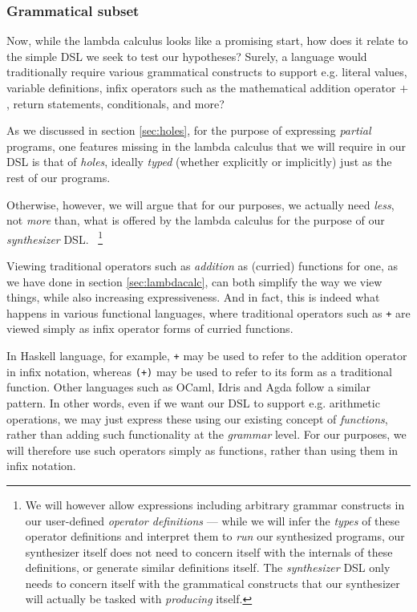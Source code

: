 \documentclass{article}
\begin{document}
\subsubsection{Grammatical subset}

Now, while the lambda calculus looks like a promising start,
how does it relate to the simple DSL we seek to test our hypotheses?
Surely, a language would traditionally require various grammatical constructs to support e.g.
literal values, variable definitions, infix operators such as the mathematical addition operator $+$, return statements, conditionals, and more?

As we discussed in section \ref{sec:holes},
for the purpose of expressing \emph{partial} programs,
one features missing in the lambda calculus that we will require in our DSL is that of \emph{holes},
ideally \emph{typed} (whether explicitly or implicitly) just as the rest of our programs.

Otherwise, however, we will argue that for our purposes,
we actually need \emph{less},
not \emph{more} than,
what is offered by the lambda calculus for the purpose of our \emph{synthesizer} DSL.%
~\footnote{
    We will however allow expressions including arbitrary grammar constructs in our user-defined \emph{operator definitions} ---
    while we will infer the \emph{types} of these operator definitions and interpret them to \emph{run} our synthesized programs,
    our synthesizer itself does not need to concern itself with the internals of these definitions,
    or generate similar definitions itself.
    The \emph{synthesizer} DSL only needs to concern itself with the grammatical constructs that our synthesizer will actually be tasked with \emph{producing} itself.
}


Viewing traditional operators such as \emph{addition} as (curried) functions for one,
as we have done in section \ref{sec:lambdacalc},
can both simplify the way we view things,
while also increasing expressiveness.
And in fact, this is indeed what happens in various functional languages,
where traditional operators such as \verb|+| are viewed simply as infix operator forms of curried functions.

In Haskell language, for example, \verb|+| may be used to refer to the addition operator in infix notation,
whereas \verb|(+)| may be used to refer to its form as a traditional function.
Other languages such as OCaml, Idris and Agda follow a similar pattern.
In other words, even if we want our DSL to support e.g. arithmetic operations,
we may just express these using our existing concept of \emph{functions},
rather than adding such functionality at the \emph{grammar} level.
For our purposes, we will therefore use such operators simply as functions,
rather than using them in infix notation.
\end{document}
